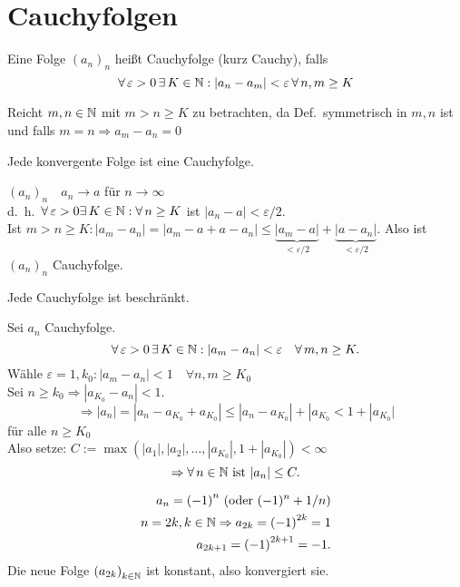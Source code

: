 \documentclass[../ana1.tex]{subfiles}
\begin{document}
\setcounter{section}{8}

\section{Cauchyfolgen}
\begin{defi}[Cauchyfolge]
	Eine Folge \({(a_n)}_n\) heißt Cauchyfolge (kurz Cauchy), falls
	\[\forall \varepsilon > 0 \,\exists K\in\N: |a_n-a_m| < \varepsilon \, \forall n,m\geq K \]
\end{defi}
\begin{bem}
	Reicht \(m,n\in\mathbb{N} \) mit \( m>n\geq K \) zu betrachten, da Def.\ symmetrisch in \(m,n\) ist und falls \(m=n \Rightarrow a_m-a_n=0\)
\end{bem}
\begin{lem}
	Jede konvergente Folge ist eine Cauchyfolge.
\end{lem}
\begin{bew}
	\( {(a_n)}_n \quad a_n \rightarrow a \) für \(n\rightarrow\infty \) \\
	d.\ h.\  \( \forall \varepsilon > 0 \exists K \in \N: \forall n\geq K \) ist \( |a_n-a| < \varepsilon/2 \).\\
	Ist \(m>n\geq K: |a_m -a_n| = |a_m-a+a-a_n| \leq \underbrace{|a_m-a|}_{<\varepsilon/2} + \underbrace{ |a-a_n| }_{<\varepsilon/2}. \) Also ist \({(a_n)}_n\) Cauchyfolge.
\end{bew}
\begin{lem}
	Jede Cauchyfolge ist beschränkt.
\end{lem}
\begin{bew}
	Sei \(a_n\) Cauchyfolge. 
	\[ \forall \varepsilon > 0 \, \exists K\in\N:|a_m-a_n| < \varepsilon \quad \forall m,n\geq K. \]
	Wähle \(\varepsilon = 1, k_0: |a_m-a_n| < 1 \quad \forall n,m\geq K_0 \) \\
	Sei \(n \geq k_0 \Rightarrow |a_{K_0} - a_n| < 1. \)
	\[ \Rightarrow |a_n| = |a_n - a_{K_0} + a_{K_0}| \leq |a_n - a_{K_0}| + |a_{K_0} < 1 + |a_{K_0}| \] für alle \(n\geq K_0\) \\
	Also setze: \( C := \max ( |a_1|,|a_2|,\ldots,|a_{K_0}|,1+|a_{K_0}| ) < \infty \) 
	\[ \Rightarrow \forall n\in\N \text{ ist } |a_n| \leq C. \]
\end{bew}
\begin{bsp}
	\begin{align*}
		a_n = {(-1)}^n \text{ (oder } (-1)^n + 1/n \text{)} \\
		n = 2k, k\in\mathbb{N} \Rightarrow a_{2k} = {(-1)}^{2k} = 1 \\
		a_{2k+1} = {(-1)}^{2k+1} = -1.
	\end{align*}
	Die neue Folge \( {(a_{2k})}_{k\in\mathbb{N}} \) ist konstant, also konvergiert sie.
\end{bsp}
\end{document}
